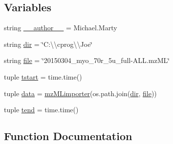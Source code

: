 \subsection*{Variables}
\begin{DoxyCompactItemize}
\item 
string \hyperlink{namespace_uni_dec_1_1unidec__modules_1_1mz_m_limporter_a82659bee05a1be259670128b1bd42888}{\+\_\+\+\_\+author\+\_\+\+\_\+} = \textquotesingle{}Michael.\+Marty\textquotesingle{}
\item 
string \hyperlink{namespace_uni_dec_1_1unidec__modules_1_1mz_m_limporter_a8c288ac27fe16cab6e808d3911d4d6e2}{dir} = \char`\"{}C\+:\textbackslash{}\textbackslash{}cprog\textbackslash{}\textbackslash{}\+Joe\char`\"{}
\item 
string \hyperlink{namespace_uni_dec_1_1unidec__modules_1_1mz_m_limporter_a5dac537b0afac164eee0a8f9d7979a56}{file} = \char`\"{}20150304\+\_\+myo\+\_\+70r\+\_\+5u\+\_\+full-\/\+A\+L\+L.\+mz\+M\+L\char`\"{}
\item 
tuple \hyperlink{namespace_uni_dec_1_1unidec__modules_1_1mz_m_limporter_a3ef8ebcc858234a798d0f6842c5041bc}{tstart} = time.\+time()
\item 
tuple \hyperlink{namespace_uni_dec_1_1unidec__modules_1_1mz_m_limporter_abf8cd37698c991b1af59d02c50fa3750}{data} = \hyperlink{class_uni_dec_1_1unidec__modules_1_1mz_m_limporter_1_1mz_m_limporter}{mz\+M\+Limporter}(os.\+path.\+join(\hyperlink{namespace_uni_dec_1_1unidec__modules_1_1mz_m_limporter_a8c288ac27fe16cab6e808d3911d4d6e2}{dir}, \hyperlink{namespace_uni_dec_1_1unidec__modules_1_1mz_m_limporter_a5dac537b0afac164eee0a8f9d7979a56}{file}))
\item 
tuple \hyperlink{namespace_uni_dec_1_1unidec__modules_1_1mz_m_limporter_ac2d823261c18ce098ddb2cdde3a435bf}{tend} = time.\+time()
\end{DoxyCompactItemize}


\subsection{Function Documentation}
\hypertarget{namespace_uni_dec_1_1unidec__modules_1_1mz_m_limporter_a21e7a05bdc041971966cc62d601949c9}{}

